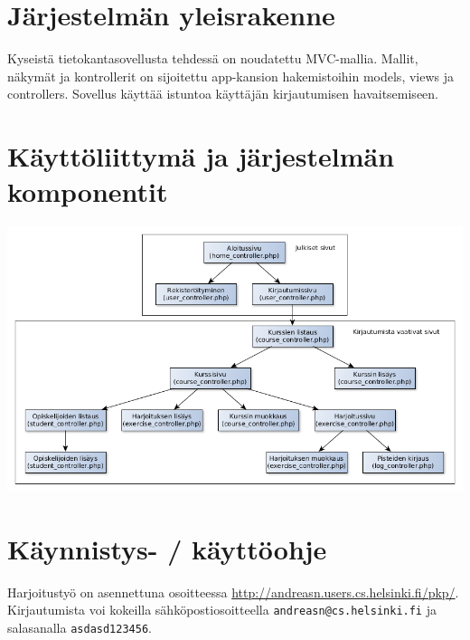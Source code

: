 \documentclass[a4paper,12pt, titlepage]{article}
\begin{document}
\section{Järjestelmän yleisrakenne}

Kyseistä tietokantasovellusta tehdessä on noudatettu MVC-mallia.
Mallit, näkymät ja kontrollerit on sijoitettu app-kansion hakemistoihin models, views ja controllers.
Sovellus käyttää istuntoa käyttäjän kirjautumisen havaitsemiseen.

\section{Käyttöliittymä ja järjestelmän komponentit}

\includegraphics[scale=0.45]{kayttoliittyma}

\section{Käynnistys- / käyttöohje}

Harjoitustyö on asennettuna osoitteessa \url{http://andreasn.users.cs.helsinki.fi/pkp/}.
Kirjautumista voi kokeilla sähköpostiosoitteella \verb|andreasn@cs.helsinki.fi|
ja salasanalla \verb|asdasd123456|.
\end{document}
